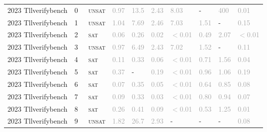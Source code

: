 \begin{center}
{\begin{longtable}{@{}llllllllll@{}}
\midrule
2023 Tllverifybench & 0 & ~\textsc{unsat} & \textcolor{darkgray}{0.97} & \textcolor{darkgray}{13.5} & \textcolor{darkgray}{2.43} & \textcolor{darkgray}{8.03} & - & \textcolor{darkgray}{400} & \textcolor{darkgray}{0.01} \\
2023 Tllverifybench & 1 & ~\textsc{unsat} & \textcolor{darkgray}{1.04} & \textcolor{darkgray}{7.69} & \textcolor{darkgray}{2.46} & \textcolor{darkgray}{7.03} & \textcolor{darkgray}{1.51} & - & \textcolor{darkgray}{0.15} \\
2023 Tllverifybench & 2 & ~\textsc{sat} & \textcolor{darkgray}{0.06} & \textcolor{darkgray}{0.26} & \textcolor{darkgray}{0.02} & \textcolor{darkgray}{$<$0.01} & \textcolor{darkgray}{0.49} & \textcolor{darkgray}{2.07} & \textcolor{darkgray}{$<$0.01} \\
2023 Tllverifybench & 3 & ~\textsc{unsat} & \textcolor{darkgray}{0.97} & \textcolor{darkgray}{6.49} & \textcolor{darkgray}{2.43} & \textcolor{darkgray}{7.02} & \textcolor{darkgray}{1.52} & - & \textcolor{darkgray}{0.11} \\
2023 Tllverifybench & 4 & ~\textsc{sat} & \textcolor{darkgray}{0.11} & \textcolor{darkgray}{0.33} & \textcolor{darkgray}{0.06} & \textcolor{darkgray}{$<$0.01} & \textcolor{darkgray}{0.71} & \textcolor{darkgray}{1.56} & \textcolor{darkgray}{0.04} \\
2023 Tllverifybench & 5 & ~\textsc{sat} & \textcolor{darkgray}{0.37} & - & \textcolor{darkgray}{0.19} & \textcolor{darkgray}{$<$0.01} & \textcolor{darkgray}{0.96} & \textcolor{darkgray}{1.06} & \textcolor{darkgray}{0.19} \\
2023 Tllverifybench & 6 & ~\textsc{sat} & \textcolor{darkgray}{0.07} & \textcolor{darkgray}{0.35} & \textcolor{darkgray}{0.05} & \textcolor{darkgray}{$<$0.01} & \textcolor{darkgray}{0.64} & \textcolor{darkgray}{0.85} & \textcolor{darkgray}{0.08} \\
2023 Tllverifybench & 7 & ~\textsc{sat} & \textcolor{darkgray}{0.09} & \textcolor{darkgray}{0.33} & \textcolor{darkgray}{0.03} & \textcolor{darkgray}{$<$0.01} & \textcolor{darkgray}{0.80} & \textcolor{darkgray}{0.94} & \textcolor{darkgray}{0.07} \\
2023 Tllverifybench & 8 & ~\textsc{sat} & \textcolor{darkgray}{0.26} & \textcolor{darkgray}{0.41} & \textcolor{darkgray}{0.09} & \textcolor{darkgray}{$<$0.01} & \textcolor{darkgray}{0.53} & \textcolor{darkgray}{1.25} & \textcolor{darkgray}{0.01} \\
2023 Tllverifybench & 9 & ~\textsc{unsat} & \textcolor{darkgray}{1.82} & \textcolor{darkgray}{26.7} & \textcolor{darkgray}{2.93} & - & - & - & \textcolor{darkgray}{0.08} \\

\end{longtable}}
\end{center}
